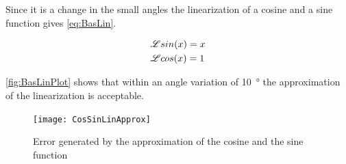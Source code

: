 Since it is a change in the small angles the linearization of a cosine and a sine function gives \autoref{eq:BasLin}.

\begin{subequations}\label{eq:BasLin}
	\begin{flalign}
		&\mathscr{L}{sin(x)}=x \addunit{1}\\
		&\mathscr{L}{cos(x)}=1 \addunit{1}
	\end{flalign}
\end{subequations}

\autoref{fig:BasLinPlot} shows that within an angle variation of \SI{10}{\degree} the approximation of the linearization is acceptable.

\begin{figure}[htbp]
	\centering
	\texttt{[image: CosSinLinApprox]}
	\caption{Error generated by the approximation of the cosine and the sine function}\label{fig:BasLinPlot}
\end{figure}